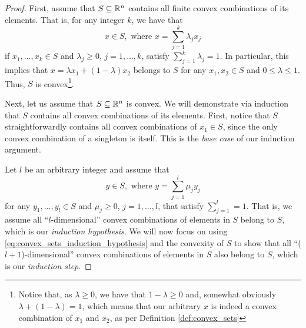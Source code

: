 \begin{proof}
	First, assume that $S \subseteq \mathbb{R}^n$ contains all finite convex combinations of its elements. That is, for any integer $k$, we have that
	\begin{equation*}
		x \in S, \text{ where } x = \sum_{j=1}^k \lambda_j x_j 
	\end{equation*}
	if $x_1,\dots,x_k \in S$ and $\lambda_j \geq 0$, $j = 1, \dots, k$, satisfy $\sum_{j=1}^k \lambda_j =1$.	In particular, this implies that $x = \lambda x_1 + (1-\lambda)x_2$ belongs to $S$ for any $x_1, x_2 \in S$ and $0 \le \lambda \le 1$. Thus, $S$ is convex\footnote{Notice that, as $\lambda \ge 0$, we have that $1 - \lambda \ge 0$ and, somewhat obviously $\lambda + (1 - \lambda) = 1$, which means that our arbitrary $x$ is indeed a convex combination of $x_1$ and $x_2$, as per Definition \ref{def:convex_sets}}.
	
	Next, let us assume that $S \subseteq \mathbb{R}^n$ is convex. We will demonstrate via induction that $S$ contains all convex combinations of its elements. First, notice that $S$ straightforwardly contains all convex combinations of $x_1 \in S$, since the only convex combination of a singleton is itself. This is the \emph{base case} of our induction argument.
	
	Let $l$ be an arbitrary integer and assume that 
%
	\begin{equation}
		y \in S, \text{ where } y = \sum_{j=1}^l \mu_j y_j \label{eq:convex_sets_induction_hypothesis}
	\end{equation}
%
	for any $y_1, \dots, y_l \in S$ and $\mu_j \ge 0$, $j = 1, \dots, l$, that satisfy $\sum_{j=1}^l = 1$. That is, we assume all ``$l$-dimensional'' convex combinations of elements in $S$ belong to $S$, which is our \emph{induction hypothesis}. We will now focus on using \eqref{eq:convex_sets_induction_hypothesis} and the convexity of $S$ to show that all ``($l+1$)-dimensional'' convex combinations of elements in $S$ also belong to $S$, which is our \emph{induction step}.
	

\end{proof}
